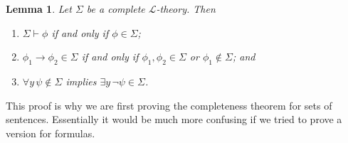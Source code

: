 \documentclass[11pt]{article}
\newcommand{\proves}{\vdash}
\newtheorem{lemma}[theorem]{Lemma}
\newcommand{\mcal}[1]{\mathcal{#1}}
\begin{document}
\begin{lemma}\label{dedweneed}
Let $\Sigma$ be a complete $\mcal{L}$-theory. Then
\begin{enumerate}
\item $\Sigma\proves \phi$ if and only if $\phi\in\Sigma$;
\item $\phi_1\rightarrow \phi_2\in \Sigma$ if and only if $\phi_1,\phi_2\in \Sigma$ or $\phi_1\notin\Sigma$; and
\item $\forall y\,\psi\notin \Sigma$ implies $\exists y\, \neg \psi\in \Sigma$.
\end{enumerate}
\end{lemma}

This proof is why we are first proving the completeness theorem for sets of sentences. Essentially it would be much more confusing if we tried to prove a version for formulas.
\end{document}
